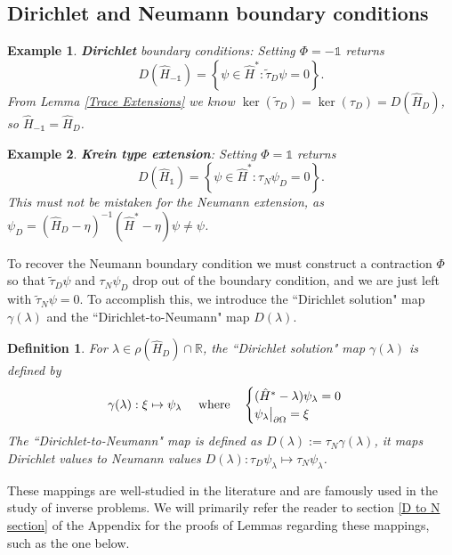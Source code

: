 \documentclass{article}
\numberwithin{equation}{section}
\newtheorem{example}{Example}[section]
\newtheorem{definition}{Definition}[section]
\begin{document}
\subsection{Dirichlet and Neumann boundary conditions}
\begin{example}\textbf{Dirichlet} boundary conditions: \em{Setting $\Phi=-\mathds{1}$ returns
    \begin{equation}
        D(\hat{H}_{-\mathds{1}})= \left\{\psi \in \hat{H}^*: \tilde{\tau}_D \psi=0 \right\}.
    \end{equation}
    From Lemma \ref{Trace Extensions} we know $\ker(\tilde{\tau}_D)=\ker(\tau_D)=D(\hat{H}_D)$, so $\hat{H}_{-\mathds{1}}= \hat{H}_D$.}
\end{example}
\begin{example}\label{Krein Extension}
    \textbf{Krein type extension}: \em{Setting $\Phi=\mathds{1}$ returns
    \begin{equation}
        D(\hat{H}_{\mathds{1}})= \left\{\psi \in \hat{H}^*: \tau_N \psi_D=0 \right\}.
    \end{equation}
This must not be mistaken for the Neumann extension, as $\psi_D=(\hat{H}_D-\eta)^{-1}(\hat{H}^*-\eta)\psi \neq \psi$.}
\end{example}
To recover the Neumann boundary condition we must construct a contraction $\Phi$ so that $\tilde{\tau}_D \psi$ and $\tau_N \psi_D$ drop out of the boundary condition, and we are just left with $\tilde{\tau}_N \psi=0$. To accomplish this, we introduce the ``Dirichlet solution" map $\gamma(\lambda)$ and the ``Dirichlet-to-Neumann" map $D(\lambda)$.
\begin{definition}
    For $\lambda \in \rho(\hat{H}_D)\cap\mathbb{R}$, the ``Dirichlet solution" map $\gamma(\lambda)$ is defined by
    \begin{equation}
        \gamma(\lambda):\xi \mapsto \psi_\lambda \quad \text{ where} \quad \begin{cases}
                (\hat{H}^*-\lambda)\psi_\lambda=0
                \\
                \psi_\lambda \big{|}_{\partial \Omega}=\xi
            \end{cases}
    \end{equation}
    The ``Dirichlet-to-Neumann" map is defined as $D(\lambda):=\tau_N\gamma(\lambda)$, it maps Dirichlet values to Neumann values $D(\lambda):\tau_D\psi_\lambda \mapsto\tau_N\psi_\lambda$. 
    \end{definition}
    These mappings are well-studied in the literature and are famously used in the study of inverse problems. We will primarily refer the reader to section \ref{D to N section} of the Appendix for the proofs of Lemmas regarding these mappings, such as the one below.
\end{document}
